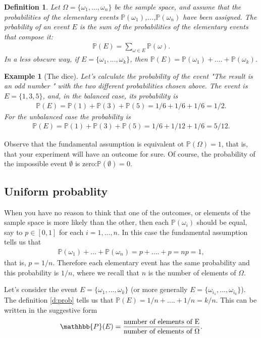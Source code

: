 \documentclass[12pt]{article}
\newtheorem{definition}[theorem]{Definition}
\newtheorem{example}[theorem]{Example}
\newcommand{\<}{{\langle \!\! \langle}}
\renewcommand{\>}{{\rangle \!\! \rangle}}
\newcommand{\bel}[2]{\begin{equation} \label{#1} \begin{split} #2
 					\end{split} \end{equation}}
\begin{document}
\begin{definition}
	Let $\Omega =\{\omega_1,...,\omega_n\}$ be the sample space, and assume that the probabilities of the elementary events $\mathbb{P}(\omega_1)$,...,$\mathbb{P}(\omega_n)$ have been assigned. The prbability of an event $E$ is the sum of the probabilities of the elementary events that compose it:
	\bel{d:prob}{\mathbb{P}(E)=\sum_{\omega\in E}\mathbb{P}(\omega).}
In a less obscure way, if $E=\{\omega_1,...,\omega_k\}$, then $\mathbb{P}(E)=\mathbb{P}(\omega_1)+....+\mathbb{P}(\omega_k)$. 
\end{definition}

	\begin{example}[The dice]
		Let's calculate the probability of the event "The result is an odd number " with the two different probabilities chosen above. The event is $ E=\{1,3,5\}$, and, in the balanced case, its probability is 
		\bel{}{\mathbb{P}(E)=\mathbb{P}(1)+\mathbb{P}(3)+\mathbb{P}(5)=1/6+1/6+1/6=1/2.}
		For the unbalanced case the probability is	
		\bel{}{\mathbb{P}(E)=\mathbb{P}(1)+\mathbb{P}(3)+\mathbb{P}(5)=1/6+1/12+1/6=5/12.}
		
	\end{example}

	Observe that the fundamental assumption is equivalent ot $\mathbb{P}(\Omega)=1$, that is, that your experiment will have an outcome for sure. Of course, the probability of the impossible event $\emptyset$ is zero:$ \mathbb{P}(\emptyset)=0$. 

	\subsection{Uniform probablity }
	When you have no reason to think that one of the outcomes, or elements of the sample space is more likely than the other, then each $\mathbb{P}(\omega_i)$ should be equal, say to $p\in [0,1]$ for each $i=1,...,n$. 
	In this case the fundamental assumption tells us that 
	\bel{}{\mathbb{P}(\omega_1)+...+\mathbb{P}(\omega_n)=p+....+p= np =1,}
	that is, $p=1/n$. Therefore each elementary event has the same probability and this probability is $1/n$, where we recall that $n$ is the number of elements of $\Omega$. 



	Let's consider the event $E=\{\omega_1,...,\omega_k\}$ (or more generally $E=\{\omega_{i_1},...,\omega_{i_k}\}$). The definition  \eqref{d:prob} tells us that $\mathbb{P}(E)=1/n+....+1/n=k/n$. This can be written in the suggestive form 
	\bel{}{
		\mathhbb{P}(E)=\frac{\textrm{number of elements of E}}{\textrm{number of elements of $\Omega$}}.}
\end{document}
